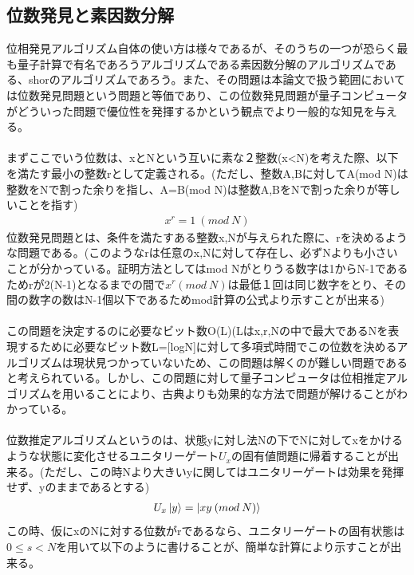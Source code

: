 \documentclass[a4paper,10.5pt]{article}
\numberwithin{equation}{section}
\begin{document}
\subsection{位数発見と素因数分解}
位相発見アルゴリズム自体の使い方は様々であるが、そのうちの一つが恐らく最も量子計算で有名であろうアルゴリズムである素因数分解のアルゴリズムである、shorのアルゴリズムであろう。また、その問題は本論文で扱う範囲においては位数発見問題という問題と等価であり、この位数発見問題が量子コンピュータがどういった問題で優位性を発揮するかという観点でより一般的な知見を与える。\\
\\
まずここでいう位数は、xとNという互いに素な２整数(x<N)を考えた際、以下を満たす最小の整数rとして定義される。(ただし、整数A,Bに対してA(mod N)は整数をNで割った余りを指し、A=B(mod N)は整数A,BをNで割った余りが等しいことを指す)
 \begin{equation}\begin{split}
     x^{r} = 1 \:(mod\:N)
 \end{split} \end{equation}
位数発見問題とは、条件を満たすある整数x,Nが与えられた際に、rを決めるような問題である。(このようなrは任意のx,Nに対して存在し、必ずNよりも小さいことが分かっている。証明方法としてはmod Nがとりうる数字は1からN-1であるためrが2(N-1)となるまでの間で$x^{r}(mod\:N)$は最低１回は同じ数字をとり、その間の数字の数はN-1個以下であるためmod計算の公式より示すことが出来る)\\
\\
この問題を決定するのに必要なビット数O(L)(Lはx,r,Nの中で最大であるNを表現するために必要なビット数L=[logN]に対して多項式時間でこの位数を決めるアルゴリズムは現状見つかっていないため、この問題は解くのが難しい問題であると考えられている。しかし、この問題に対して量子コンピュータは位相推定アルゴリズムを用いることにより、古典よりも効果的な方法で問題が解けることがわかっている。\\
\\
位数推定アルゴリズムというのは、状態yに対し法Nの下でNに対してxをかけるような状態に変化させるユニタリーゲート$U_{x}$の固有値問題に帰着することが出来る。(ただし、この時Nより大きいyに関してはユニタリーゲートは効果を発揮せず、yのままであるとする)
 \begin{equation}\begin{split}
     U_{x}\ket{y} = \ket{xy \:(mod \:N)} \label{Uxn}
 \end{split} \end{equation}
 この時、仮にxのNに対する位数がrであるなら、ユニタリーゲートの固有状態は$0\leq s <N$を用いて以下のように書けることが、簡単な計算により示すことが出来る。
\end{document}

